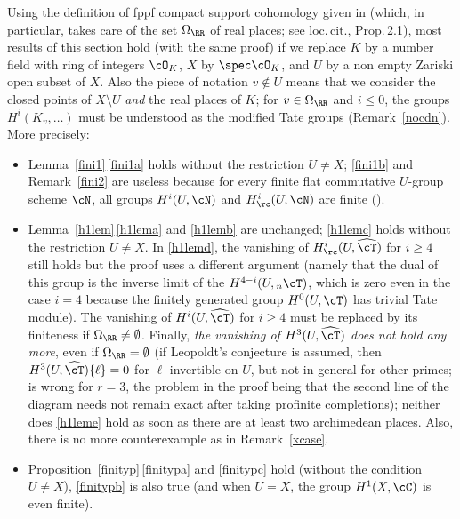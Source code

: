 \begin{rema} \label{cdn1}
Using the definition of fppf compact support cohomology
given in \cite{DemH} (which, in particular, takes care of the
set $\Omega_{\RR}$ of real places; see loc.\,cit., Prop.\,2.1),
most results of this section hold (with the same proof) if
we replace $K$ by a number field with ring of integers $\cO_K$,
$X$ by $\spec \cO_K$, and
$U$ by a non empty Zariski open subset of $X$. Also the piece of notation
$v \not \in U$ means that we consider the closed points of
$X\setminus U$ \emph{and}
the real places of $K$; for $v \in \Omega_{\RR}$ and $i \leq 0$,
the groups $H^i(K_v,\dots)$
must be understood as the modified Tate groups (\cf Remark~\ref{nocdn}).
More precisely:
\begin{itemize}
\item Lemma~\ref{fini1}\,\eqref{fini1a} holds without the restriction $U \neq X$; \eqref{fini1b} and Remark~\ref{fini2} are useless because for every finite flat commutative
$U$-group scheme $\cN$, all groups $H^i(U,\cN)$
and $H^i_\rc(U,\cN)$ are finite (\cf \cite[Th.\,1.1]{DemH}).

\item Lemma~\ref{h1lem}\,\eqref{h1lema} and \eqref{h1lemb} are unchanged; \eqref{h1lemc} holds without the
restriction $U \neq X$. In \eqref{h1lemd}, the vanishing of $H^i_\rc(U,\widehat \cT)$
for $i \geq 4$ still holds but the proof uses a different argument (namely
that the dual of this group is the inverse limit of the $H^{4-i}(U, {}_n \cT)$,
which is zero even in the case $i=4$ because the finitely generated
group $H^0(U,\cT)$ has trivial Tate module). The vanishing
of $H^i(U,\widehat \cT)$ for $i \geq 4$ must be replaced by its finiteness if
$\Omega_{\RR} \neq \emptyset$.
Finally, \emph{the vanishing of $H^3(U,\widehat \cT)$ does not
hold any more}, even if $\Omega_{\RR}=\emptyset$
(if Leopoldt's conjecture is assumed, then
$H^3(U,\widehat \cT) \{\ell\}=0$ for $\ell$ invertible on $U$, but
not in general for other primes; \cite[Th.\,II.4.6\,(b)]{MilADT} is wrong for
$r=3$, the problem in the proof being that the second line of the diagram
needs not remain exact after taking profinite completions); neither does \eqref{h1leme} hold as soon as there are at least two archimedean places. Also, there is no more counterexample as in Remark~\ref{xcase}.

\item Proposition~\ref{finityp}\,\eqref{finitypa} and \eqref{finitypc}
hold (without the condition $U \neq X$),
\eqref{finitypb} is also true (and when $U=X$, the group $H^1(X,\cC)$ is even finite).
\end{itemize}
\end{rema}

